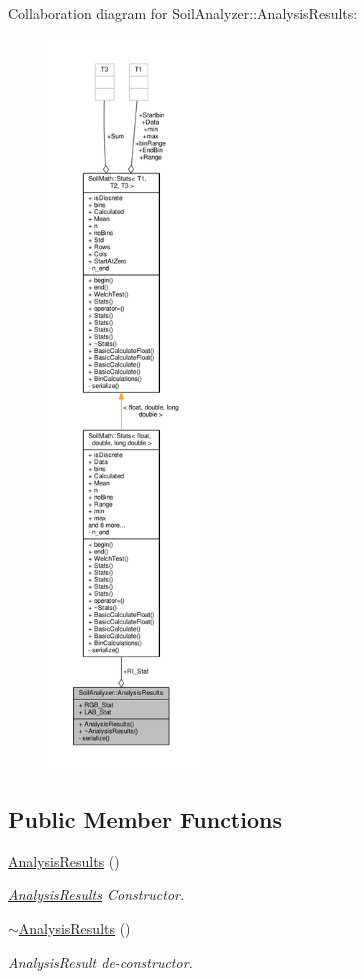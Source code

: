 Collaboration diagram for Soil\+Analyzer\+:\+:Analysis\+Results\+:\nopagebreak
\begin{figure}[H]
\begin{center}
\leavevmode
\includegraphics[height=550pt]{class_soil_analyzer_1_1_analysis_results__coll__graph}
\end{center}
\end{figure}
\subsection*{Public Member Functions}
\begin{DoxyCompactItemize}
\item 
\hyperlink{class_soil_analyzer_1_1_analysis_results_a893864c1e4bf50bf6979088a390da482}{Analysis\+Results} ()
\begin{DoxyCompactList}\small\item\em \hyperlink{class_soil_analyzer_1_1_analysis_results}{Analysis\+Results} Constructor. \end{DoxyCompactList}\item 
\hyperlink{class_soil_analyzer_1_1_analysis_results_aacbbf98653346b6176867a352c83587e}{$\sim$\+Analysis\+Results} ()
\begin{DoxyCompactList}\small\item\em Analysis\+Result de-\/constructor. \end{DoxyCompactList}\end{DoxyCompactItemize}
